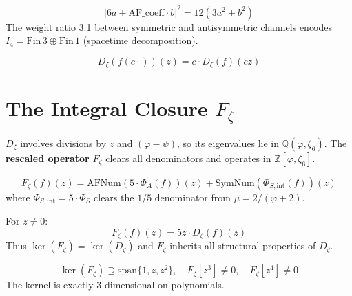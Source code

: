 \begin{theorem}
\label{thm:Dzeta_normSq}
\leanok
\[
|6a + \mathrm{AF\_coeff} \cdot b|^2 = 12(3a^2 + b^2)
\]
The weight ratio 3:1 between symmetric and antisymmetric channels encodes $I_4 = \mathrm{Fin}\,3 \oplus \mathrm{Fin}\,1$ (spacetime decomposition).
\end{theorem}

\begin{theorem}
\label{thm:Dzeta_covariance}
\leanok
\[
D_\zeta(f(c\cdot))(z) = c \cdot D_\zeta(f)(cz)
\]
\end{theorem}

\section{The Integral Closure \texorpdfstring{$F_\zeta$}{Fζ}}
\label{sec:Fzeta_operator}

$D_\zeta$ involves divisions by $z$ and $(\varphi - \psi)$, so its eigenvalues lie in $\mathbb{Q}(\varphi, \zeta_6)$.
The \textbf{rescaled operator} $F_\zeta$ clears all denominators and operates in $\mathbb{Z}[\varphi, \zeta_6]$.

\begin{definition}
\label{def:Fzeta}
\leanok
\[
F_\zeta(f)(z) = \mathrm{AFNum}(5 \cdot \Phi_A(f))(z) + \mathrm{SymNum}(\Phi_{S,\mathrm{int}}(f))(z)
\]
where $\Phi_{S,\mathrm{int}} = 5 \cdot \Phi_S$ clears the $1/5$ denominator from $\mu = 2/(\varphi + 2)$.
\end{definition}

\begin{theorem}[$F_\zeta = 5z \cdot D_\zeta$]
\label{thm:Fzeta_eq}
\leanok
For $z \neq 0$:
\[
F_\zeta(f)(z) = 5z \cdot D_\zeta(f)(z)
\]
Thus $\ker(F_\zeta) = \ker(D_\zeta)$ and $F_\zeta$ inherits all structural properties of $D_\zeta$.
\end{theorem}

\begin{theorem}
\label{thm:Fzeta_kernel}
\leanok
\[
\ker(F_\zeta) \supseteq \mathrm{span}\{1, z, z^2\}, \quad F_\zeta[z^3] \neq 0, \quad F_\zeta[z^4] \neq 0
\]
The kernel is exactly 3-dimensional on polynomials.
\end{theorem}

